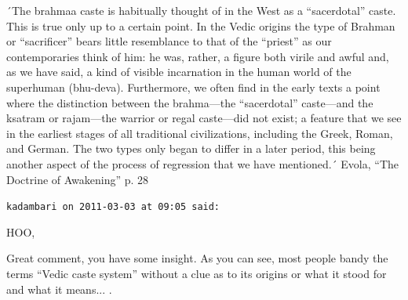 \begin{footnotesize}
\begin{sffamily}
´The brahmaa caste is habitually thought of in the West as a ``sacerdotal'' caste. This is true only up to a certain point. In the Vedic origins the type of Brahman or ``sacrificer'' bears little resemblance to that of the ``priest'' as our contemporaries think of him: he was, rather, a figure both virile and awful and, as we have said, a kind of visible incarnation in the human world of the superhuman (bhu-deva). Furthermore, we often find in the early texts a point where the distinction between the brahma---the ``sacerdotal'' caste---and the ksatram or rajam---the warrior or regal caste---did not exist; a feature that we see in the earliest stages of all traditional civilizations, including the Greek, Roman, and German. The two types only began to differ in a later period, this being another aspect of the process of regression that we have mentioned.´ Evola, ``The Doctrine of Awakening'' p. 28 \hfill

\texttt{kadambari on 2011-03-03 at 09:05 said:}

HOO,

Great comment, you have some insight. As you can see, most people bandy the terms ``Vedic caste system'' without a clue as to its origins or what it stood for and what it means... .

\end{sffamily}
\end{footnotesize}

